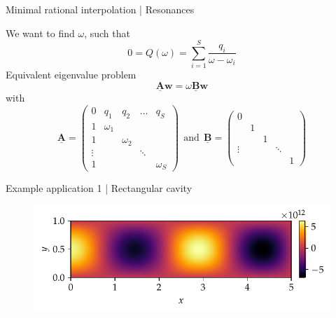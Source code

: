 \documentclass{beamer}
\begin{document}
\begin{frame}{Minimal rational interpolation | Resonances}

    We want to find $\omega$, such that
    \begin{equation*}
        0 = Q(\omega) = \sum_{i=1}^S \frac{q_i}{\omega - \omega_i}
    \end{equation*}
    Equivalent eigenvalue problem \cite{klein}
    \begin{equation*}
        \mathbf{\underline{A}} \mathbf{w} = \omega \mathbf{\underline{B}} \mathbf{w}
    \end{equation*}
    with
    \begin{equation*}
        \mathbf{\underline{A}} = \begin{pmatrix}
            0 & q_1 & q_2 & \dots & q_S \\
            1 & \omega_1 & & & \\
            1 & & \omega_2 & & \\
            \vdots & & & \ddots & \\
            1 & & & & \omega_S
        \end{pmatrix} ~~\text{and}~~
        \mathbf{\underline{B}} = \begin{pmatrix}
            0 & & & & \\
            & 1 & & & \\
            & & 1 & & \\ 
            \vdots & & & \ddots & \\ 
            & & & & 1
        \end{pmatrix}
    \end{equation*}

\end{frame}

\begin{frame}{Example application 1 | Rectangular cavity}

    \begin{figure}
        \centering
        \scalebox{0.9}{}
    \end{figure}
    \vspace{-45pt}
    \begin{figure}
        \centering
        \includegraphics[scale=0.9]{../report/plots/rectangular_cavity_mode1.pdf}
    \end{figure}

\end{frame}
\end{document}
